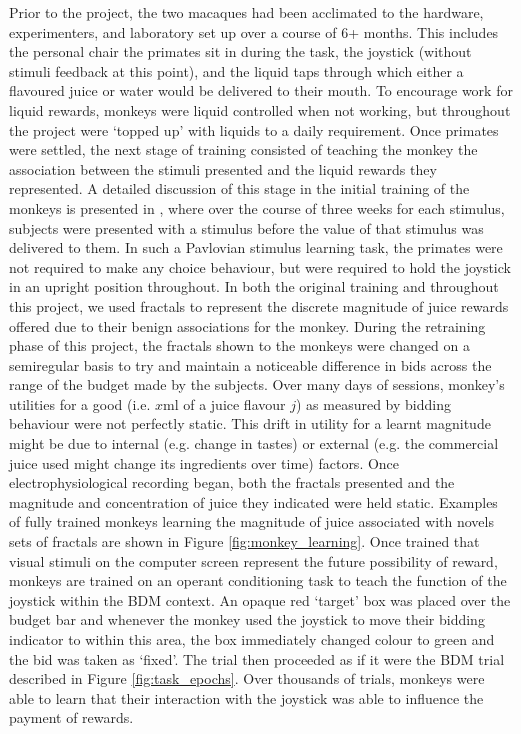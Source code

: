 Prior to the project, the two macaques had been acclimated to the hardware, experimenters, and laboratory set up over a course of 6+ months. This includes the personal chair the primates sit in during the task, the joystick (without stimuli feedback at this point), and the liquid taps through which either a flavoured juice or water would be delivered to their mouth. To encourage work for liquid rewards, monkeys were liquid controlled when not working, but throughout the project were ‘topped up’ with liquids to a daily requirement.
Once primates were settled, the next stage of training consisted of teaching the monkey the association between the stimuli presented and the liquid rewards they represented. A detailed discussion of this stage in the initial training of the monkeys is presented in \cite{almohammadRewardValueRevealed2022}, where over the course of three weeks for each stimulus, subjects were presented with a stimulus before the value of that stimulus was delivered to them. In such a Pavlovian stimulus learning task, the primates were not required to make any choice behaviour, but were required to hold the joystick in an upright position throughout.
    In both the original training and throughout this project, we used fractals to represent the discrete magnitude of juice rewards offered due to their benign associations for the monkey. During the retraining phase of this project, the fractals shown to the monkeys were changed on a semiregular basis to try and maintain a noticeable difference in bids across the range of the budget made by the subjects. Over many days of sessions, monkey’s utilities for a good (i.e. $x$ml of a juice flavour $j$) as measured by bidding behaviour were not perfectly static. This drift in utility for a learnt magnitude might be due to internal (e.g. change in tastes) or external (e.g. the commercial juice used might change its ingredients over time) factors. Once electrophysiological recording began, both the fractals presented and the magnitude and concentration of juice they indicated were held static. Examples of fully trained monkeys learning the magnitude of juice associated with novels sets of fractals are shown in Figure \ref{fig:monkey_learning}.
Once trained that visual stimuli on the computer screen represent the future possibility of reward, monkeys are trained on an operant conditioning task to teach the function of the joystick within the BDM context. An opaque red ‘target’ box was placed over the budget bar and whenever the monkey used the joystick to move their bidding indicator to within this area, the box immediately changed colour to green and the bid was taken as ‘fixed’. The trial then proceeded as if it were the BDM trial described in Figure \ref{fig:task_epochs}. Over thousands of trials, monkeys were able to learn that their interaction with the joystick was able to influence the payment of rewards.
    
